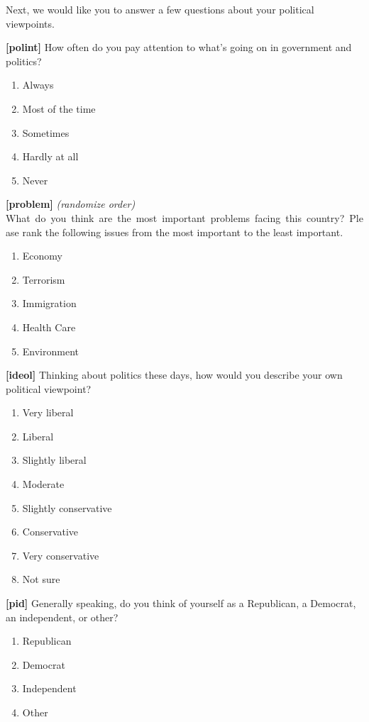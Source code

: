 \documentclass[]{article}
\providecommand{\tightlist}{%
  \setlength{\itemsep}{0pt}\setlength{\parskip}{0pt}}
\begin{document}
Next, we would like you to answer a few questions about your political
viewpoints.

\textbf{{[}polint{]}} How often do you pay attention to what's going on
in government and politics?

\begin{enumerate}
\def\labelenumi{\arabic{enumi}.}
\tightlist
\item
  Always
\item
  Most of the time
\item
  Sometimes
\item
  Hardly at all
\item
  Never
\end{enumerate}

\textbf{{[}problem{]}} \emph{(randomize order)}
What~do~you~think~are~the~most~important~problems~facing~this~country?~Please
rank the following issues from the most important to the least
important.

\begin{enumerate}
\def\labelenumi{\arabic{enumi}.}
\tightlist
\item
  Economy
\item
  Terrorism
\item
  Immigration
\item
  Health Care
\item
  Environment
\end{enumerate}

\textbf{{[}ideol{]}} Thinking about politics these days, how would you
describe your own political viewpoint?

\begin{enumerate}
\def\labelenumi{\arabic{enumi}.}
\tightlist
\item
  Very liberal
\item
  Liberal
\item
  Slightly liberal
\item
  Moderate
\item
  Slightly conservative
\item
  Conservative
\item
  Very conservative
\item
  Not sure
\end{enumerate}

\textbf{{[}pid{]}} Generally speaking, do you think of yourself as a
Republican, a Democrat, an independent, or other?

\begin{enumerate}
\def\labelenumi{\arabic{enumi}.}
\tightlist
\item
  Republican
\item
  Democrat
\item
  Independent
\item
  Other
\end{enumerate}
\end{document}

